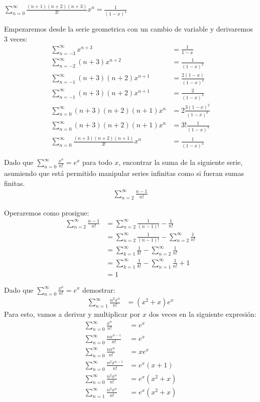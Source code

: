 \documentclass[../main.tex]{subfiles}
\begin{document}
\question $\sum_{n = 0}^\infty \frac{(n+1)(n+2)(n+3)}{3!} x^n = \frac{1}{(1-x)^4}$

Empezaremos desde la serie geometrica con un cambio de variable y derivaremos 3 veces:
\begin{align*}
    \sum_{n = -3}^\infty x^{n+3} &= \frac{1}{1-x}\\
    \sum_{n = -2}^\infty (n+3)x^{n+2} &= \frac{1}{(1-x)^2}\\
    \sum_{n = -1}^\infty (n+3)(n+2)x^{n+1} &= \frac{2(1-x)}{(1-x)^4}\\
    \sum_{n = -1}^\infty (n+3)(n+2)x^{n+1} &= \frac{2}{(1-x)^3}\\
    \sum_{n = 0}^\infty (n+3)(n+2)(n+1)x^{n} &= 2\frac{3(1-x)^2}{(1-x)^6}\\
    \sum_{n = 0}^\infty (n+3)(n+2)(n+1)x^{n} &= 3!\frac{1}{(1-x)^4}\\
    \sum_{n = 0}^\infty \frac{(n+3)(n+2)(n+1)}{3!}x^{n} &= \frac{1}{(1-x)^4}
\end{align*}

\question Dado que $\sum\limits_{n = 0}^\infty \frac{x^n}{n!} = e^x$ para todo $x$, encontrar la suma de la siguiente serie, asumiendo que está permitido manipular series infinitas como si fueran sumas finitas.
\begin{align*}
    \sum_{n = 2}^\infty \frac{n-1}{n!}
\end{align*}

Operaremos como prosigue:
\begin{align*}
    \sum_{n = 2}^\infty \frac{n-1}{n!} &= \sum_{n = 2}^\infty \frac{1}{(n-1)!} - \frac{1}{n!}\\
    &= \sum_{n =2}^\infty \frac{1}{(n-1)!} - \sum_{n = 2}^\infty \frac{1}{n!}\\
    &= \sum_{k = 1}^\infty \frac{1}{k!} - \sum_{n = 2}^\infty \frac{1}{n!}\\
    &= \sum_{k = 1}^\infty \frac{1}{k!} - \sum_{n = 1}^\infty \frac{1}{n!} + 1\\
    &= 1
\end{align*}

\question Dado que $\sum\limits_{n = 0}^\infty \frac{x^n}{n!} = e^x$ demostrar:
\begin{align*}
    \sum_{n = 1}^\infty \frac{n^2x^n}{n!} &= (x^2 + x)e^x
\end{align*}
Para esto, vamos a derivar y multiplicar por $x$ dos veces en la siguiente expresión:
\begin{align*}
    \sum_{n = 0}^\infty \frac{x^n}{n!} &= e^x\\
    \sum_{n = 0}^\infty \frac{nx^{n-1}}{n!} &= e^x\\
    \sum_{n = 0}^\infty \frac{nx^n}{n!} &= xe^x\\
    \sum_{n = 0}^\infty \frac{n^2x^{n-1}}{n!} &= e^x(x+1)\\
    \sum_{n = 0}^\infty \frac{n^2x^n}{n!} &= e^x(x^2+x)\\
    \sum_{n = 1}^\infty \frac{n^2x^n}{n!} &= e^x(x^2+x)\\
\end{align*}
\end{document}
